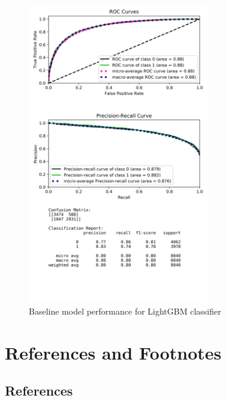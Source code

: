 \documentclass[journal,twoside,web]{ieeecolor}
\begin{document}
\begin{figure}[h!]
  \centering
  \includegraphics[width=3.1in]{project/code/preliminary-lightGBM-downsampled.png}
  \caption{Baseline model performance for LightGBM classifier}
  \label{fig:prelim-lgbm}
\end{figure}




\section*{References and Footnotes}
\subsection{References}

\nocite{*}


\end{document}
